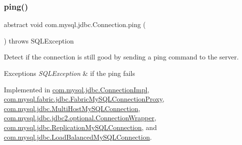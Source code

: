 \subsubsection{\texorpdfstring{ping()}{ping()}}
{\footnotesize\ttfamily abstract void com.\+mysql.\+jdbc.\+Connection.\+ping (\begin{DoxyParamCaption}{ }\end{DoxyParamCaption}) throws S\+Q\+L\+Exception\hspace{0.3cm}{\ttfamily [abstract]}}

Detect if the connection is still good by sending a ping command to the server.


\begin{DoxyExceptions}{Exceptions}
{\em S\+Q\+L\+Exception} & if the ping fails \\
\hline
\end{DoxyExceptions}


Implemented in \mbox{\hyperlink{classcom_1_1mysql_1_1jdbc_1_1_connection_impl_a8a8888884eb200c850f66c3708afad14}{com.\+mysql.\+jdbc.\+Connection\+Impl}}, \mbox{\hyperlink{classcom_1_1mysql_1_1fabric_1_1jdbc_1_1_fabric_my_s_q_l_connection_proxy_a79f343dc72188e66961f0cf251ad5443}{com.\+mysql.\+fabric.\+jdbc.\+Fabric\+My\+S\+Q\+L\+Connection\+Proxy}}, \mbox{\hyperlink{classcom_1_1mysql_1_1jdbc_1_1_multi_host_my_s_q_l_connection_a636155352e7bad08773dd608f858676c}{com.\+mysql.\+jdbc.\+Multi\+Host\+My\+S\+Q\+L\+Connection}}, \mbox{\hyperlink{classcom_1_1mysql_1_1jdbc_1_1jdbc2_1_1optional_1_1_connection_wrapper_a2c2365e7096fe3cc215832ba1f7e3594}{com.\+mysql.\+jdbc.\+jdbc2.\+optional.\+Connection\+Wrapper}}, \mbox{\hyperlink{classcom_1_1mysql_1_1jdbc_1_1_replication_my_s_q_l_connection_a2cf454e00e9fe6dcb74bb37405562e6d}{com.\+mysql.\+jdbc.\+Replication\+My\+S\+Q\+L\+Connection}}, and \mbox{\hyperlink{classcom_1_1mysql_1_1jdbc_1_1_load_balanced_my_s_q_l_connection_aa99b15e6981c678122ccce3aaf68e32c}{com.\+mysql.\+jdbc.\+Load\+Balanced\+My\+S\+Q\+L\+Connection}}.

